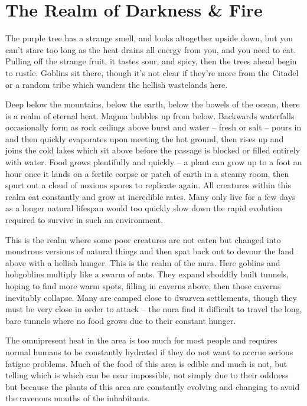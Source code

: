 \section{The Realm of Darkness \& Fire}\label{darknessandfire}

\begin{multicols}{2}

\begin{boxtext}

	The purple tree has a strange smell, and looks altogether upside down, but you can't stare too long as the heat drains all energy from you, and you need to eat.
Pulling off the strange fruit, it tastes sour, and spicy, then the trees ahead begin to rustle.
Goblins sit there, though it's not clear if they're more from the Citadel or a random tribe which wanders the hellish wastelands here.

\end{boxtext}

Deep below the mountains, below the earth, below the bowels of the ocean, there is a realm of eternal heat.
Magma bubbles up from below.
Backwards waterfalls occasionally form as rock ceilings above burst and water -- fresh or salt -- pours in and then quickly evaporates upon meeting the hot ground, then rises up and joins the cold lakes which sit above before the passage is blocked or filled entirely with water.
Food grows plentifully and quickly -- a plant can grow up to a foot an hour once it lands on a fertile corpse or patch of earth in a steamy room, then spurt out a cloud of noxious spores to replicate again.
All creatures within this realm eat constantly and grow at incredible rates.
Many only live for a few days as a longer natural lifespan would too quickly slow down the rapid evolution required to survive in such an environment.

	This is the realm where some poor creatures are not eaten but changed into monstrous versions of natural things and then spat back out to devour the land above with a hellish hunger.  This is the realm of the nura.  Here goblins and hobgoblins multiply like a swarm of ants.  They expand shoddily built tunnels, hoping to find more warm spots, filling in caverns above, then those caverns inevitably collapse.  Many are camped close to dwarven settlements, though they must be very close in order to attack -- the nura find it difficult to travel the long, bare tunnels where no food grows due to their constant hunger.

	The omnipresent heat in the area is too much for most people and requires normal humans to be constantly hydrated if they do not want to accrue serious fatigue problems.  Much of the food of this area is edible and much is not, but telling which is which can be near impossible, not simply due to their oddness but because the plants of this area are constantly evolving and changing to avoid the ravenous mouths of the inhabitants.


\end{multicols}
